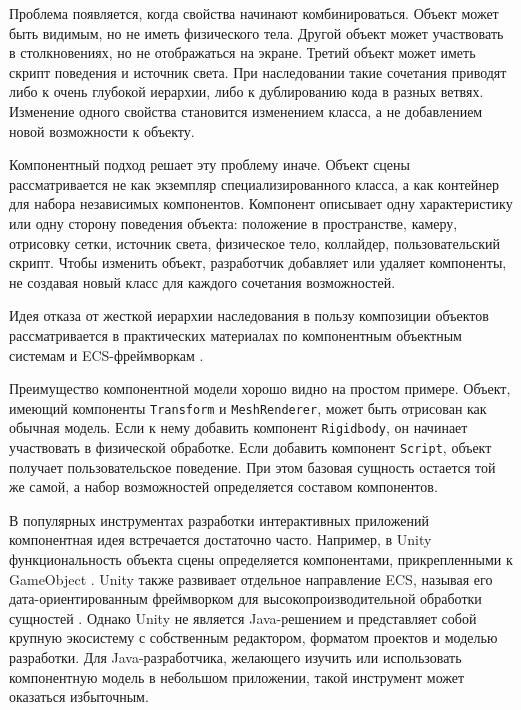 Проблема появляется, когда свойства начинают комбинироваться. Объект
может быть видимым, но не иметь физического тела. Другой объект может
участвовать в столкновениях, но не отображаться на экране. Третий объект
может иметь скрипт поведения и источник света. При наследовании такие
сочетания приводят либо к очень глубокой иерархии, либо к дублированию
кода в разных ветвях. Изменение одного свойства становится изменением
класса, а не добавлением новой возможности к объекту.

Компонентный подход решает эту проблему иначе. Объект сцены
рассматривается не как экземпляр специализированного класса, а как
контейнер для набора независимых компонентов. Компонент описывает одну
характеристику или одну сторону поведения объекта: положение в
пространстве, камеру, отрисовку сетки, источник света, физическое тело,
коллайдер, пользовательский скрипт. Чтобы изменить объект, разработчик
добавляет или удаляет компоненты, не создавая новый класс для каждого
сочетания возможностей.

Идея отказа от жесткой иерархии наследования в пользу композиции объектов
рассматривается в практических материалах по компонентным объектным системам
и ECS-фреймворкам \cite{bilas-object-system,west-hierarchy,artemis-odb,ashley-entity-system,entt-docs,flecs-docs}.

Преимущество компонентной модели хорошо видно на простом примере.
Объект, имеющий компоненты \texttt{Transform} и \texttt{MeshRenderer},
может быть отрисован как обычная модель. Если к нему добавить компонент
\texttt{Rigidbody}, он начинает участвовать в физической обработке. Если
добавить компонент \texttt{Script}, объект получает пользовательское
поведение. При этом базовая сущность остается той же самой, а набор
возможностей определяется составом компонентов.

В популярных инструментах разработки интерактивных приложений
компонентная идея встречается достаточно часто. Например, в Unity
функциональность объекта сцены определяется компонентами, прикрепленными
к GameObject \cite{unity-components}. Unity также развивает отдельное
направление ECS, называя его дата-ориентированным фреймворком для
высокопроизводительной обработки сущностей \cite{unity-ecs}. Однако Unity
не является Java-решением и представляет собой крупную экосистему с
собственным редактором, форматом проектов и моделью разработки. Для
Java-разработчика, желающего изучить или использовать компонентную модель
в небольшом приложении, такой инструмент может оказаться избыточным.

